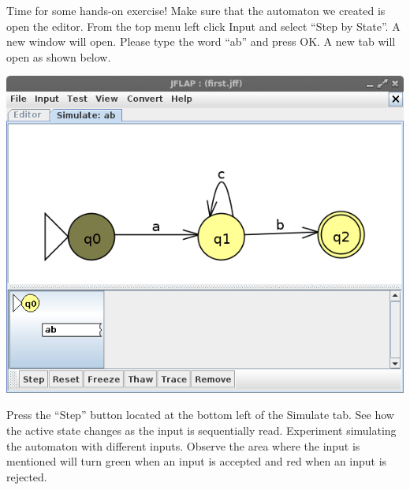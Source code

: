 \documentclass[11pt]{article}
\begin{document}
Time for some hands-on exercise! Make sure that the automaton we created is open the editor. From the top menu left click Input and select ``Step by State''. A new window will open. Please type the word ``ab'' and press OK.
%
A new tab will open as shown below.


\begin{center}
  \hspace{2em}\includegraphics[width=0.5\linewidth]{img/simulate.png}
\end{center}

Press the  ``Step'' button located at the bottom left of the Simulate tab. See how the active state changes as the input is sequentially read. Experiment simulating the automaton with different inputs.
%
Observe the area where the input is mentioned will turn green when an input is accepted and red when an input is rejected.
\end{document}
